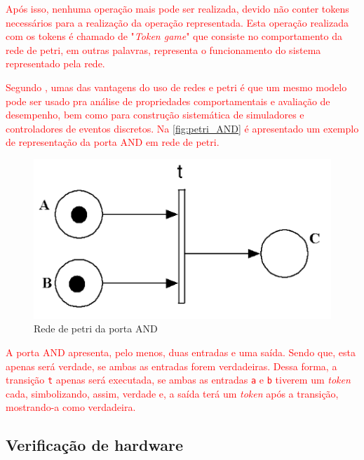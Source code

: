 \par
\textcolor{red}{Após isso, nenhuma operação mais pode ser realizada, devido não conter tokens necessários para a realização da operação representada\cite{murata1989petri}. Esta operação realizada com os tokens é chamado de "\textit{Token game}" que consiste no comportamento da rede de petri, em outras palavras, representa o funcionamento do sistema representado pela rede\cite{halder2006}.}

\par
\textcolor{red}{Segundo , umas das vantagens do uso de redes e petri é que um mesmo modelo pode ser usado pra análise de propriedades comportamentais e avaliação de desempenho, bem como para construção sistemática de simuladores e controladores de eventos discretos. Na \autoref{fig:petri_AND} é apresentado um exemplo de representação da porta AND em rede de petri.}

\begin{figure}[H]
	\begin{center}
    \caption{\label{fig:petri_AND}Rede de petri da porta AND}
	\includegraphics[scale=0.60]{Figuras/and_petri.png}
	\end{center}
\end{figure}

\par
\textcolor{red}{A porta AND apresenta, pelo menos, duas entradas e uma saída. Sendo que, esta apenas será verdade, se ambas as entradas forem verdadeiras. Dessa forma, a transição \texttt{t} apenas será executada, se ambas as entradas \texttt{a} e \texttt{b} tiverem um \textit{token} cada, simbolizando, assim, verdade e, a saída terá um \textit{token} após a transição, mostrando-a como verdadeira.}
\subsection{Verificação de hardware}

